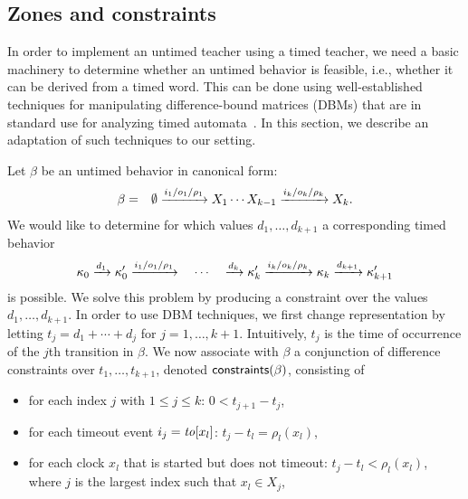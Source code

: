 \subsection{Zones and constraints}

In order to implement an untimed teacher using a timed teacher, we need a
basic machinery to determine whether an untimed behavior is feasible, i.e.,
whether it can be derived from a timed word. This can be done using
well-established techniques for manipulating difference-bound matrices
(DBMs) that are in standard use for analyzing timed
automata~\cite{Di89,BengtssonY03}.
In this section, we describe an adaptation of such techniques to
our setting.

Let $\beta$ be an untimed behavior in canonical form:
\begin{eqnarray*}
\beta & = & \emptyset \xrightarrow{i_1/o_1/\rho_1} X_1  \cdots X_{k-1} \xrightarrow{i_k/o_k/\rho_k} X_k.
\end{eqnarray*}
We would like to determine for which values $d_1, \ldots , d_{k+1}$
a corresponding timed behavior
\[
\kappa_0 \xrightarrow{d_1} \kappa'_0 \xrightarrow{i_1/o_1/\rho_1}
\quad \cdots \quad
\xrightarrow{d_k} \kappa'_k \xrightarrow{i_k/o_k/\rho_k} \kappa_k
\xrightarrow{d_{k+1}} \kappa'_{k+1}
\]
is possible. We solve this problem by producing a constraint over the
values $d_1, \ldots , d_{k+1}$. In order to use DBM techniques, we first
change representation by letting
$t_j = d_1 + \cdots + d_j$ for $j = 1 , \ldots, k+1$. Intuitively, $t_j$ is
the time of occurrence of the $j$th transition in $\beta$.
We now associate with $\beta$ a conjunction of difference constraints over
$t_1, \ldots, t_{k+1}$, denoted $\mathsf{constraints}({\beta})$, consisting of
\begin{itemize}
\item
for each index $j$ with $1 \leq j \leq k$:  $0 <  t_{j+1} - t_j$,
\item
for each timeout event $i_j = \mathit{to}[x_l]$: $t_j - t_l = \rho_l(x_l)$,
\item
for each clock $x_l$ that is started but does not timeout: $t_j -t_l < \rho_l(x_l)$,
where $j$ is the largest index such that $x_l \in X_j$,
\end{itemize}
